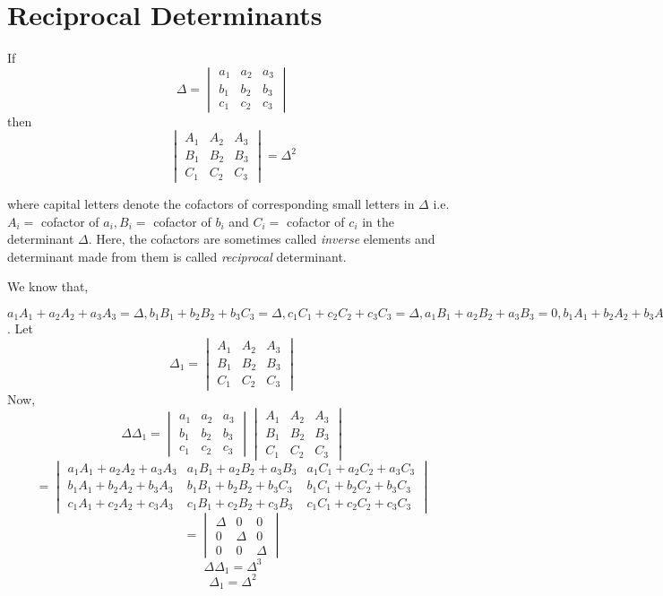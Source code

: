 \section{Reciprocal Determinants}
If $$\Delta = \begin{vmatrix}a_1 & a_2 & a_3\\b_1 & b_2 & b_3\\c_1 & c_2 & c_3\end{vmatrix}$$ then $$\begin{vmatrix}A_1 & A_2 &
    A_3\\B_1 & B_2 & B_3\\C_1 & C_2 & C_3\end{vmatrix} = \Delta^2$$

where capital letters denote the cofactors of corresponding small letters in $\Delta$ i.e. $A_i =$ cofactor of $a_i, B_i =$
cofactor of $b_i$ and $C_i =$ cofactor of $c_i$ in the determinant $\Delta$. Here, the cofactors are sometimes called
\textit{inverse} elements and determinant made from them is called \textit{reciprocal} determinant.

We know that,

$a_1A_1 + a_2A_2 + a_3A_3 = \Delta, b_1B_1 + b_2B_2 + b_3C_3 =
\Delta, c_1C_1 + c_2C_2 + c_3C_3 = \Delta, a_1B_1 + a_2B_2 +
a_3B_3 = 0, b_1A_1 + b_2A_2 + b_3A_3 = 0, a_1C_1 + a_2C_2 +
a_3C_3 = 0, c_1A_1 + c_2A_2 + c_3A_3 = 0, b_1C_1 + b_2C_2 +
b_3C_3 = 0, c_1B_1 + c_2B_2 + c_3B_3 = 0$.
Let $$\Delta_1 = \begin{vmatrix}A_1 & A_2 & A_3\\B_1 & B_2 &
B_3\\C_1 & C_2 & C_3\end{vmatrix}$$
Now, $$\Delta\Delta_1 = \begin{vmatrix}a_1 & a_2 & a_3\\b_1 & b_2 &
b_3\\c_1 & c_2 & c_3\end{vmatrix}\begin{vmatrix}A_1 & A_2 & A_3\\B_1 & B_2 &
B_3\\C_1 & C_2 & C_3\end{vmatrix}$$
$$= \begin{vmatrix}a_1A_1 + a_2A_2 + a_3A_3 & a_1B_1 + a_2B_2 + a_3B_3 &
a_1C_1 + a_2C_2 + a_3C_3\\b_1A_1 + b_2A_2 + b_3A_3 & b_1B_1 + b_2B_2 + b_3C_3 &
b_1C_1 + b_2C_2 + b_3C_3\\c_1A_1 + c_2A_2 + c_3A_3 & c_1B_1 + c_2B_2 + c_3B_3 &
c_1C_1 + c_2C_2 + c_3C_3\end{vmatrix}$$
$$= \begin{vmatrix}\Delta & 0 & 0\\0 & \Delta & 0\\0 & 0 &\Delta\end{vmatrix}$$
$$\Delta\Delta_1= \Delta^3$$
$$\Delta_1 = \Delta^2$$

